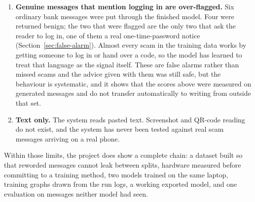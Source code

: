 \begin{enumerate}
\item \textbf{Genuine messages that mention logging in are over-flagged.} Six ordinary bank messages were put through the finished model. Four were returned benign; the two that were flagged are the only two that ask the reader to log in, one of them a real one-time-password notice (Section~\ref{sec:false-alarm}). Almost every scam in the training data works by getting someone to log in or hand over a code, so the model has learned to treat that language as the signal itself. These are false alarms rather than missed scams and the advice given with them was still safe, but the behaviour is systematic, and it shows that the scores above were measured on generated messages and do not transfer automatically to writing from outside that set.

\item \textbf{Text only.} The system reads pasted text. Screenshot and QR-code reading do not exist, and the system has never been tested against real scam messages arriving on a real phone.
\end{enumerate}

Within those limits, the project does show a complete chain: a dataset built so that reworded messages cannot leak between splits, hardware measured before committing to a training method, two models trained on the same laptop, training graphs drawn from the run logs, a working exported model, and one evaluation on messages neither model had seen.

